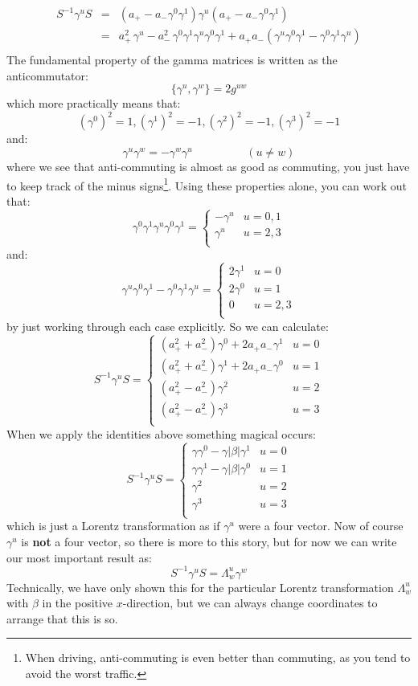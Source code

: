 \documentclass[12pt]{book}
\begin{document}
\begin{eqnarray*}
S^{-1} \gamma^u S &=& (a_+ - a_- \gamma^0 \gamma^1) \gamma^u (a_+ - a_- \gamma^0 \gamma^1)\\
&=& a_+^2 \, \gamma^u - a_-^2 \, \gamma^0 \gamma^1 \gamma^u \gamma^0 \gamma^1
+ a_+ a_- (\gamma^u \gamma^0 \gamma^1 - \gamma^0 \gamma^1 \gamma^u)\\
\end{eqnarray*}
The fundamental property of the gamma matrices is written as the anticommutator:
$$\{\gamma^u, \gamma^w\} = 2 g^{uw}$$
which more practically means that:
$$(\gamma^0)^2 = 1, (\gamma^1)^2 = -1, (\gamma^2)^2 = -1, (\gamma^3)^2 = -1$$
and:
$$\gamma^u \gamma^w = -\gamma^w \gamma^u \hspace{2cm} (u \neq w)$$
where we see that anti-commuting is almost as good as commuting, you just have to keep track of the minus signs\footnote{When driving, anti-commuting is even better than commuting, as you tend to avoid the worst traffic.}. Using these properties alone, you can work out that:
$$\gamma^0\gamma^1\gamma^u\gamma^0\gamma^1 = \begin{cases}
- \gamma^u & u=0,1 \\
\gamma^u & u=2,3 \\
\end{cases}$$
and:
$$\gamma^u \gamma^0 \gamma^1 - \gamma^0 \gamma^1 \gamma^u 
= \begin{cases}
2\gamma^1 & u=0 \\
2\gamma^0 & u=1 \\
0 & u=2,3 \\ 
\end{cases}$$
by just working through each case explicitly.  So we can calculate:
$$S^{-1} \gamma^u S = 
\begin{cases}
(a_+^2 + a_-^2) \gamma^0 + 2 a_+ a_- \gamma^1 & u=0 \\
(a_+^2 + a_-^2) \gamma^1 + 2 a_+ a_- \gamma^0 & u=1 \\
(a_+^2 - a_-^2) \gamma^2                      & u=2 \\
(a_+^2 - a_-^2) \gamma^3                      & u=3 \\
\end{cases}$$
When we apply the identities above something magical occurs:
$$S^{-1} \gamma^u S = 
\begin{cases}
\gamma \gamma^0 - \gamma |\beta| \gamma^1 & u=0 \\
\gamma \gamma^1 - \gamma |\beta| \gamma^0 & u=1 \\
\gamma^2                      & u=2 \\
\gamma^3                      & u=3 \\
\end{cases}$$
which is just a Lorentz transformation as if $\gamma^u$ were a four vector.  Now of course $\gamma^u$ is {\bf not} a four vector, so there is more to this story, but for now we can write our most important result as:
$$S^{-1} \gamma^u S = \Lambda^u_w \gamma^w$$
Technically, we have only shown this for the particular Lorentz transformation $\Lambda^u_w$ with $\beta$ in the positive $x$-direction, but we can always change coordinates to arrange that this is so.
\end{document}
